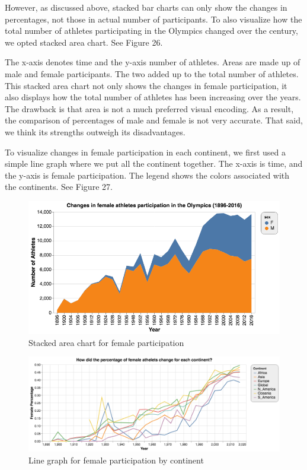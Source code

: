 \documentclass[12pt]{article}
\begin{document}
However, as discussed above, stacked bar charts can only show the changes in percentages, not those in actual number of participants. To also visualize how the total number of athletes participating in the Olympics changed over the century, we opted stacked area chart. See Figure 26.

The x-axis denotes time and the y-axis number of athletes. Areas are made up of male and female participants. The two added up to the total number of athletes. This stacked area chart not only shows the changes in female participation, it also displays how the total number of athletes has been increasing over the years. The drawback is that area is not a much preferred visual encoding. As a result, the comparison of percentages of male and female is not very accurate. That said, we think its strengths outweigh its disadvantages.

To visualize changes in female participation in each continent, we first used a simple line graph where we put all the continent together. The x-axis is time, and the y-axis is female participation. The legend shows the colors associated with the continents. See Figure 27.

\vspace{20pt}
\begin{figure}[!b]
    \centering
    \includegraphics[scale=0.625]{pics/g-1-4_new.png}
    \caption{Stacked area chart for female participation}
    \label{fig:my_label}
\end{figure}

\begin{figure}[!t]
    \centering
    \includegraphics[scale=0.5]{pics/g-2-1_new.png}
    \caption{Line graph for female participation by continent}
    \label{fig:my_label}
\end{figure}
\end{document}
